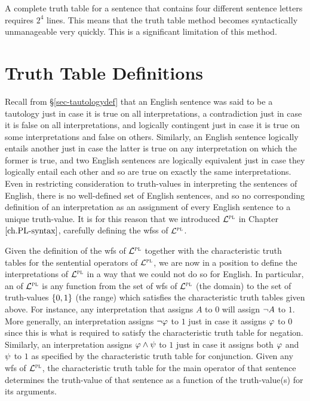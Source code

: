 A complete truth table for a sentence that contains four different sentence letters requires $2^4$ lines.
This means that the truth table method becomes syntactically unmanageable very quickly.
This is a significant limitation of this method.





\section{Truth Table Definitions}
\label{sec.usingtruthtables}

Recall from \S\ref{sec-tautologydef} that an English sentence was said to be a tautology just in case it is true on all interpretations, a contradiction just in case it is false on all interpretations, and logically contingent just in case it is true on some interpretations and false on others.
Similarly, an English sentence logically entails another just in case the latter is true on any interpretation on which the former is true, and two English sentences are logically equivalent just in case they logically entail each other and so are true on exactly the same interpretations.
Even in restricting consideration to truth-values in interpreting the sentences of English, there is no well-defined set of English sentences, and so no corresponding definition of an interpretation as an assignment of every English sentence to a unique truth-value.
It is for this reason that we introduced $\mathcal{L}^{\textsc{pl}}$ in Chapter $\ref{ch.PL-syntax}$, carefully defining the wfss of $\mathcal{L}^{\textsc{pl}}$.

Given the definition of the wfs of $\mathcal{L}^{\textsc{pl}}$ together with the characteristic truth tables for the sentential operators of $\mathcal{L}^{\textsc{pl}}$, we are now in a position to define the interpretations of $\mathcal{L}^{\textsc{pl}}$ in a way that we could not do so for English.
In particular, an  of $\mathcal{L}^{\textsc{pl}}$ is any function from the set of wfs of $\mathcal{L}^{\textsc{pl}}$ (the domain) to the set of truth-values $\lbrace0,1\rbrace$ (the range) which satisfies the characteristic truth tables given above.
For instance, any interpretation that assigns $A$ to $0$ will assign $\neg A$ to $1$. 
More generally, an interpretation assigns $\neg \varphi$ to $1$ just in case it assigns $\varphi$ to $0$ since this is what is required to satisfy the characteristic truth table for negation. 
Similarly, an interpretation assigns $\varphi \wedge \psi$ to $1$ just in case it assigns both $\varphi$ and $\psi$ to $1$ as specified by the characteristic truth table for conjunction. 
Given any wfs of $\mathcal{L}^{\textsc{pl}}$, the characteristic truth table for the main operator of that sentence determines the truth-value of that sentence as a function of the truth-value(s) for its arguments.

